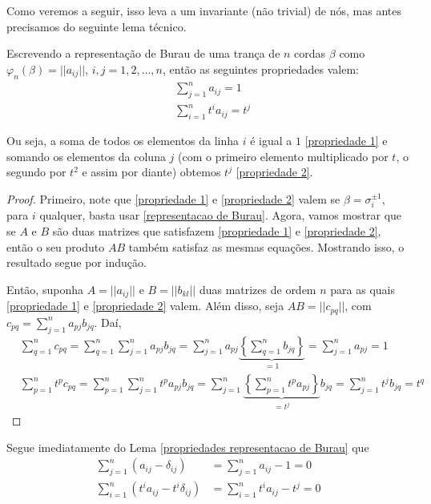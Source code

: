 	\par\vspace{0.3cm} Como veremos a seguir, isso leva a um invariante (não trivial) de nós, mas antes precisamos do seguinte lema técnico.
	\begin{lemma}
		\label{propriedades representacao de Burau}
		Escrevendo a representação de Burau de uma trança de $n$ cordas $\beta$ como $\varphi_n(\beta) = ||a_{ij}||$, $i,j=1,2,\dots,n$, então as seguintes propriedades valem:
		\begin{align}
		\label{propriedade 1}
		&\sum_{j=1}^{n}a_{ij} = 1 \\
		\label{propriedade 2}
		&\sum_{i=1}^{n} t^ia_{ij} = t^j 
		\end{align}
		\par Ou seja, a soma de todos os elementos da linha $i$ é igual a $1$ \eqref{propriedade 1} e somando os elementos da coluna $j$ (com o primeiro elemento multiplicado por $t$, o segundo por $t^2$ e assim por diante) obtemos $t^j$ \eqref{propriedade 2}.
	\end{lemma}
	\begin{proof}
		Primeiro, note que \eqref{propriedade 1} e \eqref{propriedade 2} valem se $\beta = \sigma_i^{\pm1}$, para $i$ qualquer, basta usar \eqref{representacao de Burau}. Agora, vamos mostrar que se $A$ e $B$ são duas matrizes que satisfazem \eqref{propriedade 1} e \eqref{propriedade 2}, então o seu produto $AB$ também satisfaz as mesmas equações. Mostrando isso, o resultado segue por indução.
		\par\vspace{0.3cm} Então, suponha $A = ||a_{ij}||$ e $B = || b_{kl} ||$ duas matrizes de ordem $n$ para as quais \eqref{propriedade 1} e \eqref{propriedade 2} valem. Além disso, seja $AB = || c_{pq} ||$, com $c_{pq} = \displaystyle{ \sum_{j=1}^{n}a_{pj}b_{jq} }$. Daí, 
		\begin{align*}
		&\sum_{q=1}^{n}c_{pq} = \sum_{q=1}^{n}\sum_{j=1}^{n}a_{pj}b_{jq} = \sum_{j=1}^{n}a_{pj}\underbrace{\left\{\sum_{q=1}^{n}b_{jq}\right\}}_{=1} =
		\sum_{j=1}^{n}a_{pj} = 1 \\
		&\sum_{p=1}^{n}t^pc_{pq} = \sum_{p=1}^{n}\sum_{j=1}^{n}t^pa_{pj}b_{jq} = \sum_{j=1}^{n}\underbrace{ \left\{ \sum_{p=1}^{n}t^pa_{pj} \right\}}_{=t^j}b_{jq} = \sum_{j=1}^{n}t^jb_{jq} = t^q
		\end{align*}	
	\end{proof}
	\par Segue imediatamente do Lema \eqref{propriedades representacao de Burau} que
	\begin{align}
	\label{consequencia 1}
	\sum_{j=1}^{n}(a_{ij} - \delta_{ij}) &= \sum_{j=1}^{n}a_{ij} - 1 = 0 \\ 
	\label{consequencia 2}
	\sum_{i=1}^{n}(t^ia_{ij} - t^i\delta_{ij}) &= \sum_{i=1}^{n}t^ia_{ij} - t^j = 0
	\end{align}
